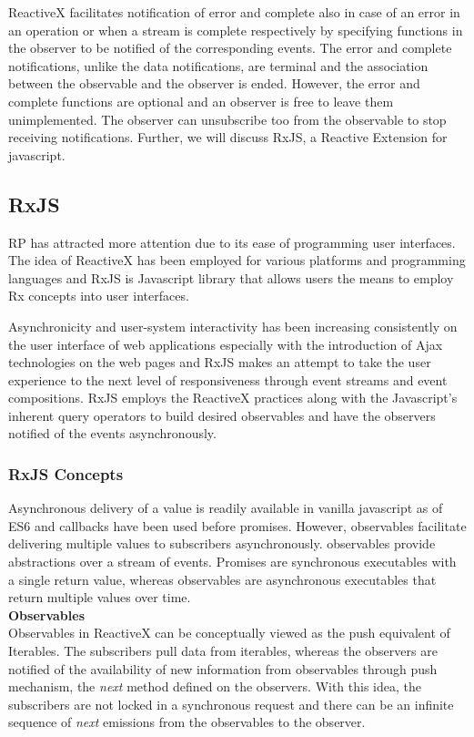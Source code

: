 ReactiveX facilitates notification of error and complete also in case of an error in an operation or when a stream is complete respectively by specifying functions in the observer to be notified of the corresponding events. The error and complete notifications, unlike the data notifications, are terminal and the association between the observable and the observer is ended. However, the error and complete functions are optional and an observer is free to leave them unimplemented. The observer can unsubscribe too from the observable to stop receiving notifications. Further, we will discuss RxJS, a Reactive Extension for javascript.

\subsection{RxJS}
RP has attracted more attention due to its ease of programming user interfaces\cite{Schuster:2016:RPR:2892664.2892666}\cite{Bainomugisha:2013:SRP:2501654.2501666}. The idea of ReactiveX has been employed for various platforms and programming languages and RxJS is Javascript library that allows users the means to employ Rx concepts into user interfaces. 

Asynchronicity and user-system interactivity \cite{Kristaly:2008:WTW:1389586.1389663} has been increasing consistently on the user interface of web applications especially with the introduction of Ajax technologies\cite{ajaxANewWayToWP} on the web pages and RxJS makes an attempt to take the user experience to the next level of responsiveness through event streams and event compositions. RxJS employs the ReactiveX practices along with the Javascript's inherent query operators to build desired observables and have the observers notified of the events asynchronously.

\subsubsection{RxJS Concepts}
Asynchronous delivery of a value is readily available in vanilla javascript as of ES6\cite{ECMAScript} and callbacks have been used before promises. However, observables\cite{observable} facilitate delivering multiple values to subscribers asynchronously. observables provide abstractions over a stream of events. Promises are synchronous executables with a single return value, whereas observables are asynchronous executables that return multiple values over time. 
\\
\textbf{Observables}
\\
Observables in ReactiveX can be conceptually viewed as the push equivalent of Iterables\cite{reactiveX}. The subscribers pull data from iterables, whereas the observers are notified of the availability of new information from observables through push mechanism, the \textit{next} method defined on the observers. With this idea, the subscribers are not locked in a synchronous request and there can be an infinite sequence of \textit{next} emissions from the observables to the observer.

